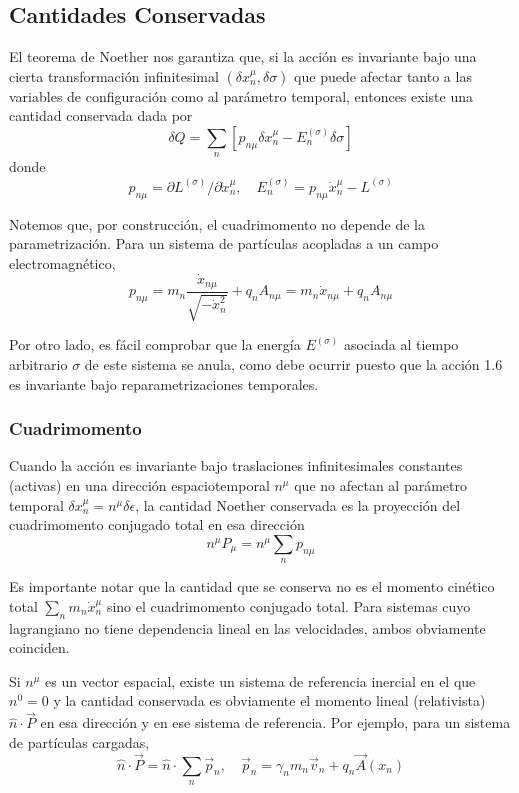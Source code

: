 \subsection{Cantidades Conservadas}
El teorema de Noether nos garantiza que, si la acción es invariante bajo una cierta transformación infinitesimal $\left(\delta x_{n}^{\mu}, \delta \sigma\right)$ que puede afectar tanto a las variables de configuración como al parámetro temporal, entonces existe una cantidad conservada dada por
$$
\delta Q=\sum_{n}\left[p_{n \mu} \delta x_{n}^{\mu}-E_{n}^{(\sigma)} \delta \sigma\right]
$$
donde
$$
p_{n \mu}=\partial L^{(\sigma)} / \partial \grave{x}_{n}^{\mu}, \quad E_{n}^{(\sigma)}=p_{n \mu} \dot{x}_{n}^{\mu}-L^{(\sigma)}
$$

Notemos que, por construcción, el cuadrimomento no depende de la parametrización. Para un sistema de partículas acopladas a un campo electromagnético,
$$
p_{n \mu}=m_{n} \frac{\dot{x}_{n \mu}}{\sqrt{-\dot{x}_{n}^{2}}}+q_{n} A_{n \mu}=m_{n} \dot{x}_{n \mu}+q_{n} A_{n \mu}
$$

Por otro lado, es fácil comprobar que la energía $E^{(\sigma)}$ asociada al tiempo arbitrario $\sigma$ de este sistema se anula, como debe ocurrir puesto que la acción 1.6 es invariante bajo reparametrizaciones temporales.
\subsubsection{Cuadrimomento}
Cuando la acción es invariante bajo traslaciones infinitesimales constantes (activas) en una dirección espaciotemporal $n^{\mu}$ que no afectan al parámetro temporal $\delta x_{n}^{\mu}=n^{\mu} \delta \epsilon$, la cantidad Noether conservada es la proyección del cuadrimomento conjugado total en esa dirección
$$
n^{\mu} P_{\mu}=n^{\mu} \sum_{n} p_{n \mu}
$$

Es importante notar que la cantidad que se conserva no es el momento cinético total $\sum_{n} m_{n} \dot{x}_{n}^{\mu}$ sino el cuadrimomento conjugado total. Para sistemas cuyo lagrangiano no tiene dependencia lineal en las velocidades, ambos obviamente coinciden.

Si $n^{\mu}$ es un vector espacial, existe un sistema de referencia inercial en el que $n^{0}=0$ y la cantidad conservada es obviamente el momento lineal (relativista) $\hat{n} \cdot \vec{P}$ en esa dirección y en ese sistema de referencia. Por ejemplo, para un sistema de partículas cargadas,
$$
\hat{n} \cdot \vec{P}=\hat{n} \cdot \sum_{n} \vec{p}_{n}, \quad \vec{p}_{n}=\gamma_{n} m_{n} \vec{v}_{n}+q_{n} \vec{A}\left(x_{n}\right)
$$

